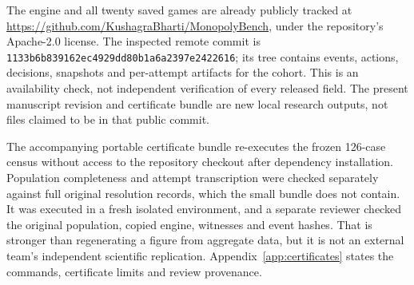 The engine and all twenty saved games are already publicly tracked at \url{https://github.com/KushagraBharti/MonopolyBench}, under the repository's Apache-2.0 license. The inspected remote commit is \texttt{1133b6b839162ec4929dd80b1a6a2397e2422616}; its tree contains events, actions, decisions, snapshots and per-attempt artifacts for the cohort. This is an availability check, not independent verification of every released field. The present manuscript revision and certificate bundle are new local research outputs, not files claimed to be in that public commit.

The accompanying portable certificate bundle re-executes the frozen 126-case census without access to the repository checkout after dependency installation. Population completeness and attempt transcription were checked separately against full original resolution records, which the small bundle does not contain. It was executed in a fresh isolated environment, and a separate reviewer checked the original population, copied engine, witnesses and event hashes. That is stronger than regenerating a figure from aggregate data, but it is not an external team's independent scientific replication. Appendix~\ref{app:certificates} states the commands, certificate limits and review provenance.


